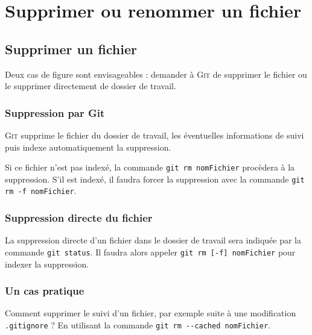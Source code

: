 \documentclass[11pt,twoside,headings=normal,open=right,french,DIV=12]{scrreprt}
\newcommand{\git}{\textsc{Git}}
\begin{document}
\section{Supprimer ou renommer un fichier}



\subsection{Supprimer un fichier}



    Deux cas de figure sont envisageables : demander à \git{} de supprimer le fichier ou le supprimer directement de dossier de travail.



\subsubsection{Suppression par Git}    



    \git{} supprime le fichier du dossier de travail, les éventuelles informations de suivi puis indexe automatiquement la suppression.
    
    Si ce fichier n'est pas indexé, la commande \verb|git rm nomFichier| procèdera à la
    suppression. S'il est indexé, il faudra forcer la suppression avec la commande
    \verb|git rm -f nomFichier|.



\subsubsection{Suppression directe du fichier}    



    La suppression directe d'un fichier dans le dossier de travail sera indiquée par la commande \verb|git status|. Il faudra alors appeler \verb|git rm [-f] nomFichier| pour indexer la suppression.



\subsubsection{Un cas pratique}    



Comment supprimer le suivi d'un fichier, par exemple suite à une modification \verb|.gitignore| ?
En utilisant la commande \verb|git rm --cached nomFichier|.
\end{document}
